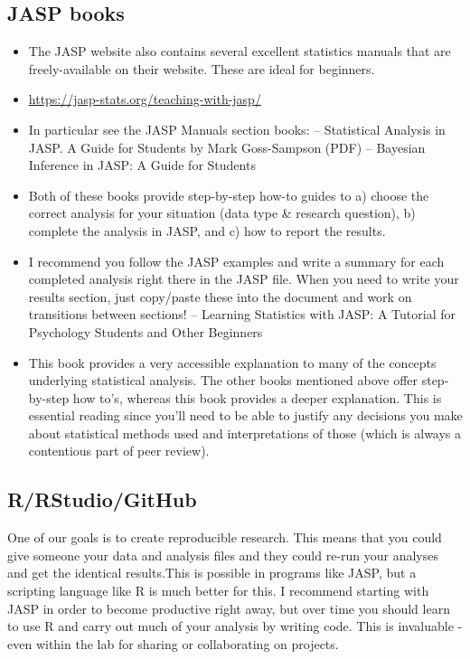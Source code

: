 \documentclass[
]{book}
\providecommand{\tightlist}{%
  \setlength{\itemsep}{0pt}\setlength{\parskip}{0pt}}
\begin{document}
\hypertarget{jasp-books}{%
\subsection{JASP books}\label{jasp-books}}

\begin{itemize}
\tightlist
\item
  The JASP website also contains several excellent statistics manuals that are freely-available on their website. These are ideal for beginners.
\item
  \url{https://jasp-stats.org/teaching-with-jasp/}
\item
  In particular see the JASP Manuals section books:
  -- Statistical Analysis in JASP. A Guide for Students by Mark Goss-Sampson (PDF)
  -- Bayesian Inference in JASP: A Guide for Students
\item
  Both of these books provide step-by-step how-to guides to a) choose the correct analysis for your situation (data type \& research question), b) complete the analysis in JASP, and c) how to report the results.
\item
  I recommend you follow the JASP examples and write a summary for each completed analysis right there in the JASP file. When you need to write your results section, just copy/paste these into the document and work on transitions between sections!
  -- Learning Statistics with JASP: A Tutorial for Psychology Students and Other Beginners
\item
  This book provides a very accessible explanation to many of the concepts underlying statistical analysis. The other books mentioned above offer step-by-step how to's, whereas this book provides a deeper explanation. This is essential reading since you'll need to be able to justify any decisions you make about statistical methods used and interpretations of those (which is always a contentious part of peer review).
\end{itemize}

\hypertarget{rrstudiogithub}{%
\subsection{R/RStudio/GitHub}\label{rrstudiogithub}}

One of our goals is to create reproducible research. This means that you could give someone your data and analysis files and they could re-run your analyses and get the identical results.This is possible in programs like JASP, but a scripting language like R is much better for this. I recommend starting with JASP in order to become productive right away, but over time you should learn to use R and carry out much of your analysis by writing code. This is invaluable - even within the lab for sharing or collaborating on projects.
\end{document}
